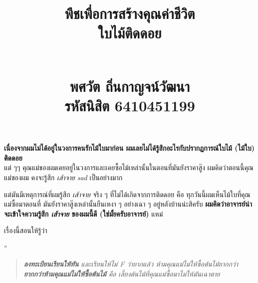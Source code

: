 \documentclass{article}
\title{\flushleft\Large พืชเพื่อการสร้างคุณค่าชีวิต\\
\Huge\textbf{ใบไม้ติดดอย}\\
\rule{0em}{1ex}\\
\normalsize พศวัต ถิ่นกาญจน์วัฒนา\\
รหัสนิสิต 6410451199
\vspace{-8ex}}
\author{}
\date{}
\begin{document}
\maketitle
\sloppy\flushleft
\textbf{เนื่องจากผมไม่ได้อยู่ในวงการคนรักไม้ใบมาก่อน ผมเลยไม่ได้รู้สึกอะไรกับปรากฏการณ์ใบไม้ (ไม้ใบ) ติดดอย}\\
แต่ ๆๆ คุณแม่ของผมเคยอยู่ในวงการและเคยซื้อไม้เหล่านั้นในตอนที่มันยังราคาสู๊ง ผมคิดว่าตอนนี้คุณแม่ของผม
คงจะรู้สึก \textit{เส้าจาย \textendash{} sad} เป็นอย่างมาก

\rule{0em}{1ex}

แต่มันมีเหตุการณ์ที่ผมรู้สึก \textit{เส้าจาย} จริง ๆ ที่ไม่ได้เกิดจากการติดดอย คือ ทุกวันนี้ผมเห็นไม้ใบที่คุณแม่ซื้อมาตอนที่
มันยังราคาสู๊งเหล่านั้นยืนเหงา ๆ อย่างเฉา ๆ อยู่หลังบ้านน่ะสิครับ \textbf{ผมคิดว่าอาจารย์น่าจะเข้าใจความรู้สึก \mbox{\textit{เส้าจาย}}
ของผมนี้ดี (ใช่มั้ยครับอาจารย์)} \textendash{} แหม่

\rule{0em}{8ex}

เรื่องนี้สอนให้รู้ว่า

\rule{0em}{5ex}

\Huge``\normalsize

\begin{quote}
\textit{%
\Large \textbf{ลงทะเบียนเรียนให้ทัน} \normalsize และเรียนให้ไม่ F ว่ายากแล้ว ห้ามคุณแม่ไม่ให้ซื้อต้นไม้ยากกว่า\\
\Large \textbf{ยากกว่าห้ามคุณแม่ไม่ให้ซื้อต้นไม้} \normalsize คือ เลี้ยงต้นไม้ที่คุณแม่ซื้อมาไม่ให้มันเฉาตาย}
\end{quote}


\end{document}
